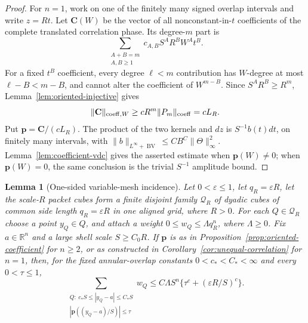 \documentclass[11pt]{article}
\numberwithin{equation}{section}
\newtheorem{lemma}[theorem]{Lemma}
\theoremstyle{remark}
\theoremstyle{definition}
\newcommand{\R}{\mathbb R}
\newcommand{\norm}[1]{\lVert #1\rVert}
\newcommand{\BV}{\operatorname{BV}}
\begin{document}
\begin{proof}
For \(n=1\), work on one of the finitely many signed overlap intervals
and write \(z=Rt\).  Let \(\mathbf C(W)\) be the vector of all
nonconstant-in-\(t\) coefficients of the complete translated correlation
phase.  Its degree-\(m\) part is
\begin{equation}\label{eq:one-dimensional-oriented}
 \sum_{\substack{A+B=m\\ A,B\ge1}}c_{A,B}S^AR^BW^At^B.
\end{equation}
For a fixed \(t^B\) coefficient, every degree \(\ell<m\) contribution
has \(W\)-degree at most \(\ell-B<m-B\), and cannot alter the coefficient
of \(W^{m-B}\).  Since \(S^AR^B\ge R^m\),
Lemma~\ref{lem:oriented-injective} gives
\[
 \norm{\mathbf C}_{\mathrm{coeff},W}
 \ge cR^m\norm{P_m}_{\rm coeff}=cL_R.
\]
Put \(\mathbf p=\mathbf C/(cL_R)\).  The product of the two kernels and
\(dz\) is \(S^{-1}b(t)dt\), on finitely many intervals, with
\(\norm b_{L^\infty+\BV}\le CB^C\norm\Theta_\infty^2\).
Lemma~\ref{lem:coefficient-vdc} gives the asserted estimate when
\(\mathbf p(W)\ne0\); when \(\mathbf p(W)=0\), the same conclusion is the
trivial \(S^{-1}\) amplitude bound.
\end{proof}

\begin{lemma}[One-sided variable-mesh incidence]
\label{lem:one-sided-incidence}
Let $0<\varepsilon\le1$, let $q_R=\varepsilon R$, let the scale-$R$
packet cubes form a finite disjoint family $\mathcal Q_R$ of dyadic cubes
of common side length $q_R=\varepsilon R$ in one aligned grid, where
$R>0$.  For each $Q\in\mathcal Q_R$ choose a
point $y_Q\in Q$, and attach a weight
$0\le w_Q\le\Lambda q_R^n$, where $\Lambda\ge0$.  Fix $a\in\R^n$ and a
large shell scale $S\ge C_0R$.  If $\mathbf p$ is as in
Proposition~\ref{prop:oriented-coefficient} for $n\ge2$, or as constructed
in Corollary~\ref{cor:unequal-correlation} for $n=1$, then, for the fixed
annular-overlap constants $0<c_*<C_*<\infty$ and every $0<\tau\le1$,
\begin{equation}\label{eq:one-sided-incidence}
 \sum_{\substack{Q:\ c_*S\le|y_Q-a|\le C_*S\\
          |\mathbf p((y_Q-a)/S)|\le\tau}}w_Q
 \le C\Lambda S^n\{\tau^c+(\varepsilon R/S)^c\}.
\end{equation}
\end{lemma}
\end{document}

